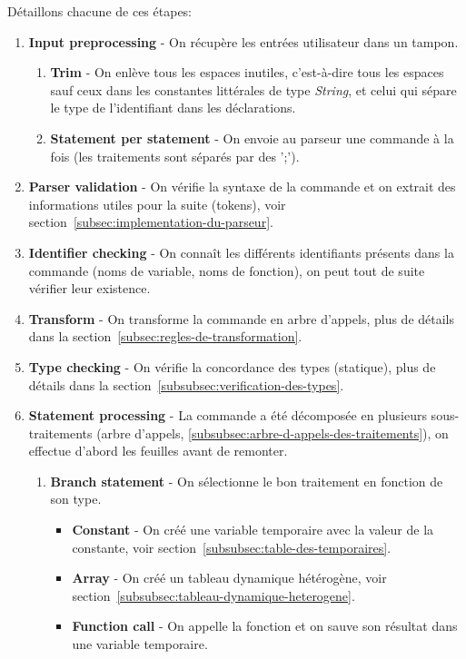 \documentclass[french]{article}
\begin{document}
		Détaillons chacune de ces étapes:
		\begin{enumerate}
			\item \textbf{Input preprocessing} - On récupère les entrées utilisateur dans un tampon.
			\begin{enumerate}
				\item \textbf{Trim} - On enlève tous les espaces inutiles, c'est-à-dire tous les espaces sauf ceux dans les constantes littérales de type \textit{String}, et celui qui sépare le type de l'identifiant dans les déclarations.
				\item \textbf{Statement per statement} - On envoie au parseur une commande à la fois (les traitements sont séparés par des ';').
			\end{enumerate}
			\item \textbf{Parser validation} - On vérifie la syntaxe de la commande et on extrait des informations utiles pour la suite (tokens), voir section~\ref{subsec:implementation-du-parseur}.
			\item \textbf{Identifier checking} - On connaît les différents identifiants présents dans la commande (noms de variable, noms de fonction), on peut tout de suite vérifier leur existence.
			\item \textbf{Transform} - On transforme la commande en arbre d'appels, plus de détails dans la section~\ref{subsec:regles-de-transformation}.
			\item \textbf{Type checking} - On vérifie la concordance des types (statique), plus de détails dans la section~\ref{subsubsec:verification-des-types}.
			\item \textbf{Statement processing} - La commande a été décomposée en plusieurs sous-traitements (arbre d'appels, \ref{subsubsec:arbre-d-appels-des-traitements}), on effectue d'abord les feuilles avant de remonter.
			\begin{enumerate}
				\item \textbf{Branch statement} - On sélectionne le bon traitement en fonction de son type.
				\begin{itemize}
					\item \textbf{Constant} - On créé une variable temporaire avec la valeur de la constante, voir section~\ref{subsubsec:table-des-temporaires}.
					\item \textbf{Array} - On créé un tableau dynamique hétérogène, voir section~\ref{subsubsec:tableau-dynamique-heterogene}.
					\item \textbf{Function call} - On appelle la fonction et on sauve son résultat dans une variable temporaire.

\end{itemize}
\end{enumerate}
\end{enumerate}
\end{document}
